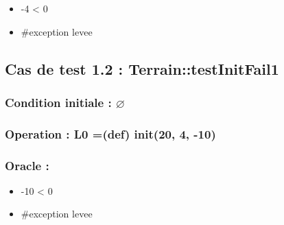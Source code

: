 \documentclass[11pt]{article}
\begin{document}
\begin{itemize}

\item -4 < 0\\
\label{sec-1.3.3.1}


\item \#exception levee\\
\label{sec-1.3.3.2}


\end{itemize} %
\subsection{Cas de test 1.2 : Terrain::testInitFail1}
\label{sec-1.4}

\subsubsection{Condition initiale : $\varnothing$}
\label{sec-1.4.1}

\subsubsection{Operation : L0 =(def) init(20, 4, -10)}
\label{sec-1.4.2}

\subsubsection{Oracle :}
\label{sec-1.4.3}

\begin{itemize}

\item -10 < 0\\
\label{sec-1.4.3.1}


\item \#exception levee\\
\label{sec-1.4.3.2}


\end{itemize} %
\end{document}
